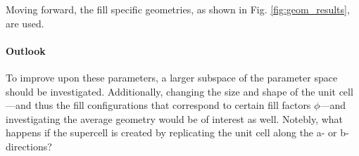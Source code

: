         Moving forward, the fill specific geometries, as shown in Fig. \ref{fig:geom_results}, are used. 
        
        \paragraph{Outlook}
        To improve upon these parameters, a larger subspace of the parameter space should be investigated. Additionally, changing the size and shape of the unit cell---and thus the fill configurations that correspond to certain fill factors $\phi$---and investigating the average geometry would be of interest as well. Notebly, what happens if the supercell is created by replicating the unit cell along the a- or b-directions? 
